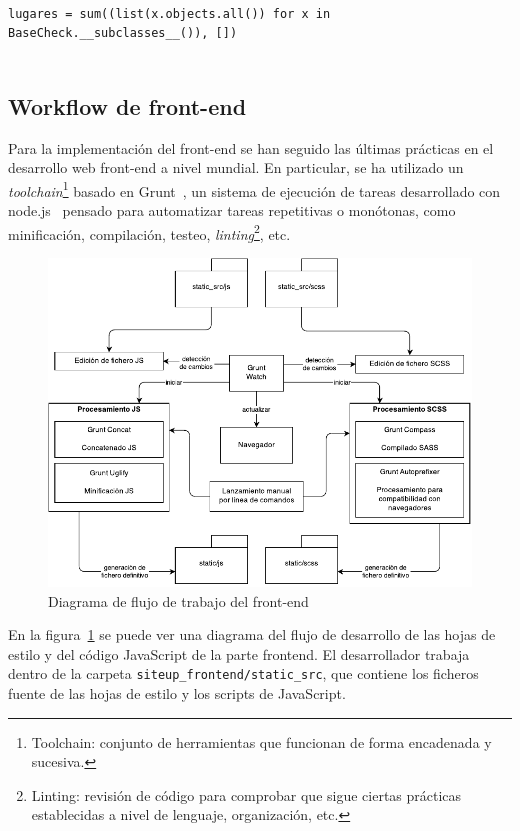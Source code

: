\begin{verbatim}

lugares = sum((list(x.objects.all()) for x in BaseCheck.__subclasses__()), [])
  
\end{verbatim}

\subsection{Workflow de front-end}
\label{sec:frontend}

Para la implementación del front-end se han seguido las últimas prácticas en el
desarrollo web front-end a nivel mundial. En particular, se ha utilizado un
\textit{toolchain}\footnote{Toolchain: conjunto de herramientas que funcionan de
  forma encadenada y sucesiva.} basado en Grunt~\cite{grunt}, un sistema de
ejecución de tareas desarrollado con node.js~\cite{nodejs} pensado para
automatizar tareas repetitivas o monótonas, como minificación, compilación,
testeo, \textit{linting}\footnote{Linting: revisión de código para comprobar que
  sigue ciertas prácticas establecidas a nivel de lenguaje, organización, etc.},
etc.

\begin{figure}[hbtp]
  \centering
  \includegraphics[width=\textwidth]{5_diseno/diagrama-frontend}
  \caption{Diagrama de flujo de trabajo del front-end}
  \label{fig:frontend}
\end{figure}

En la figura~\ref{fig:frontend} se puede ver una diagrama del flujo de
desarrollo de las hojas de estilo y del código JavaScript de la parte
frontend. El desarrollador trabaja dentro de la carpeta
\texttt{siteup\_frontend/static\_src}, que contiene los ficheros fuente de las
hojas de estilo y los scripts de JavaScript.

